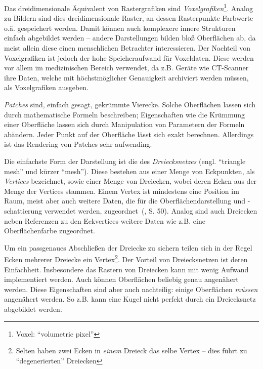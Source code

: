 \documentclass[twoside,a4paper,fleqn,12pt]{article}
\begin{document}
Das dreidimensionale Äquivalent von Rastergrafiken sind \emph{Voxelgrafiken}\footnote{Voxel: ``volumetric pixel''}. 
Analog zu Bildern sind dies dreidimensionale
Raster, an dessen Rasterpunkte Farbwerte o.ä. gespeichert werden. 
Damit können auch komplexere innere Strukturen einfach abgebildet werden -- andere Darstellungen bilden bloß
Oberflächen ab, da meist allein diese einen menschlichen Betrachter interessieren.
Der Nachteil von Voxelgrafiken ist jedoch der hohe Speicheraufwand für Voxeldaten. Diese werden
vor allem im medizinischen Bereich verwendet, da z.B. Geräte wie CT-Scanner ihre Daten, welche mit
höchstmöglicher Genauigkeit archiviert werden müssen, als Voxelgrafiken ausgeben.

\emph{Patches} sind, einfach gesagt, gekrümmte Vierecke. Solche Oberflächen lassen sich durch mathematische Formeln
beschreiben; Eigenschaften wie die Krümmung einer Oberfläche lassen sich durch Manipulation von Parametern der
Formeln abändern. Jeder Punkt auf der Oberfläche lässt sich exakt berechnen. Allerdings ist das Rendering von Patches
sehr aufwending.

Die einfachste Form der Darstellung ist die des \emph{Dreiecksnetzes} (engl. ``triangle mesh'' und kürzer ``mesh'').
 Diese bestehen aus einer Menge von Eckpunkten,
als \emph{Vertices} bezeichnet, sowie einer Menge von Dreiecken, wobei deren Ecken aus der Menge der Vertices stammen.
Einem Vertex ist mindestens eine Position im Raum, meist aber auch weitere Daten, die für die Oberflächendarstellung und
\mbox{-schattierung} verwendet werden,  zugeordnet~(\cite{watt_de}, S. 50).
Analog sind auch Dreiecken neben Referenzen zu den Eckvertices weitere Daten wie z.B. eine Oberflächenfarbe zugeordnet.

Um ein passgenaues Abschließen der Dreiecke zu sichern teilen sich in der Regel Ecken mehrerer Dreiecke ein
Vertex\footnote{Selten haben zwei Ecken in \emph{einem} Dreieck das selbe Vertex -- dies führt zu "`degenerierten"' Dreiecken}. 
Der Vorteil von Dreiecksnetzen ist deren Einfachheit. Insbesondere das Rastern von Dreiecken kann mit wenig Aufwand
implementiert werden. Auch können Oberflächen beliebig genau angenähert werden. Diese Eigenschaften sind aber auch
nachteilig: einige Oberflächen \emph{müssen} angenähert werden. So z.B. kann eine Kugel nicht perfekt durch ein Dreiecksnetz
abgebildet werden. 
\end{document}

